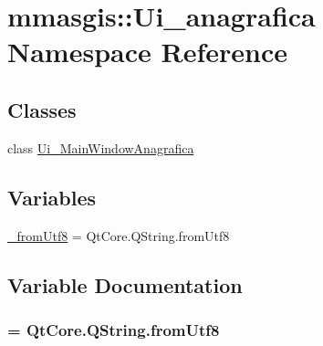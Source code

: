 \hypertarget{namespacemmasgis_1_1Ui__anagrafica}{
\section{mmasgis::Ui\_\-anagrafica Namespace Reference}
\label{namespacemmasgis_1_1Ui__anagrafica}
}
\subsection*{Classes}
\begin{DoxyCompactItemize}
\item 
class \hyperlink{classmmasgis_1_1Ui__anagrafica_1_1Ui__MainWindowAnagrafica}{Ui\_\-MainWindowAnagrafica}
\end{DoxyCompactItemize}
\subsection*{Variables}
\begin{DoxyCompactItemize}
\item 
\hyperlink{namespacemmasgis_1_1Ui__anagrafica_aabe5ab2aed7bf41a9fa42a9091892924}{\_\-fromUtf8} = QtCore.QString.fromUtf8
\end{DoxyCompactItemize}


\subsection{Variable Documentation}
\hypertarget{namespacemmasgis_1_1Ui__anagrafica_aabe5ab2aed7bf41a9fa42a9091892924}{
\subsubsection[{\_\-fromUtf8}]{ = QtCore.QString.fromUtf8}}
\label{namespacemmasgis_1_1Ui__anagrafica_aabe5ab2aed7bf41a9fa42a9091892924}
